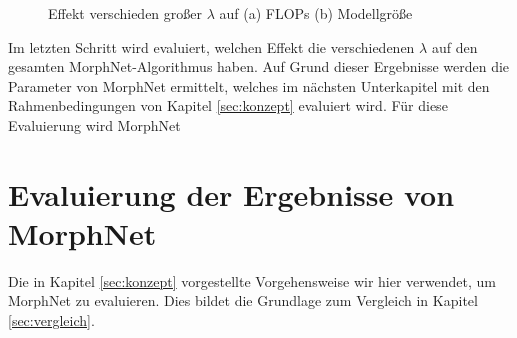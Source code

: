 \begin{figure}
     \centering
     \hfill
     \caption{Effekt verschieden großer $\lambda$ auf  (a) FLOPs (b) Modellgröße }
     \label{abb:morph2}
\end{figure}
Im letzten Schritt wird evaluiert, welchen Effekt die verschiedenen $\lambda$ auf den gesamten MorphNet-Algorithmus haben. Auf Grund dieser Ergebnisse werden die Parameter von MorphNet ermittelt, welches im nächsten Unterkapitel mit den Rahmenbedingungen von Kapitel \ref{sec:konzept} evaluiert wird. Für diese Evaluierung wird MorphNet 



\section{Evaluierung der Ergebnisse von MorphNet}

Die in Kapitel \ref{sec:konzept}  vorgestellte Vorgehensweise wir hier verwendet, um MorphNet zu evaluieren. Dies bildet die Grundlage zum Vergleich in Kapitel \ref{sec:vergleich}.















